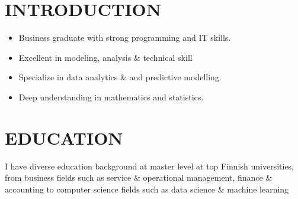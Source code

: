 \documentclass[letterpaper]{twentysecondcv} %
\begin{document}

\makeprofile %

\section{INTRODUCTION}
\begin{itemize}
	\item Business graduate with strong programming and IT skills.
	\item Excellent in modeling, analysis \& technical skill
	\item Specialize in data analytics \& and predictive modelling.
	\item Deep understanding in mathematics and statistics.
\end{itemize}


\section{EDUCATION}
I have diverse education background at master level at top Finnish universities, from business fields such as service \& operational management, finance \& accounting to computer science fields such as data science \& machine learning
\end{document}
